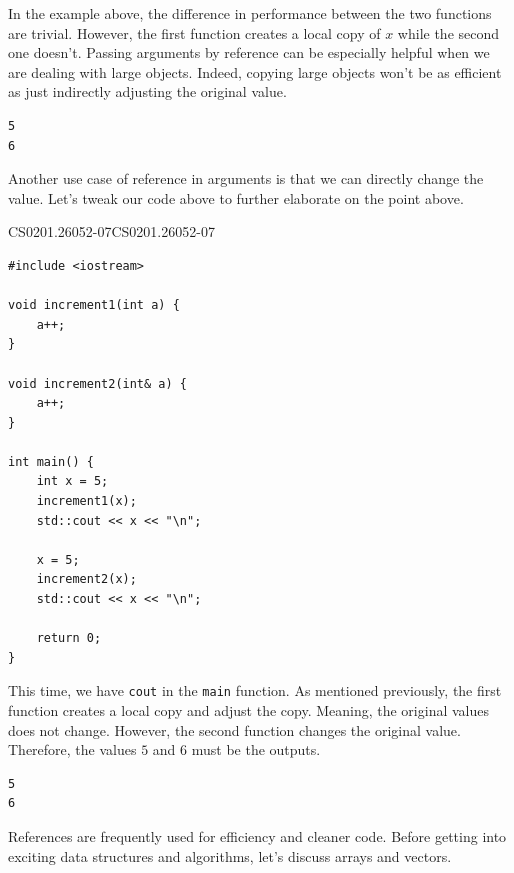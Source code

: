 \documentclass[../../../main.tex]{subfiles}
\begin{document}
In the example above, the difference in performance between the
two functions are trivial. However, the first function creates
a local copy of $x$ while the second one doesn't. Passing arguments
by reference can be especially helpful when we are dealing with
large objects. Indeed, copying large objects won't be as efficient
as just indirectly adjusting the original value.

\begin{outputbox}
\begin{lstlisting}[style=basic]
5
6
\end{lstlisting}
\end{outputbox}

Another use case of reference in arguments is that we can directly
change the value. Let's tweak our code above to further elaborate
on the point above.

\begin{cppbox}{CS0201.26052-07}{CS0201.26052-07}
\begin{lstlisting}[style=cppstyle]
#include <iostream>

void increment1(int a) {
    a++;
}

void increment2(int& a) {
    a++;
}

int main() {
    int x = 5;
    increment1(x);
    std::cout << x << "\n";

    x = 5;
    increment2(x);
    std::cout << x << "\n";

    return 0;
}
\end{lstlisting}
\end{cppbox}

This time, we have \verb|cout| in the \verb|main| function. As
mentioned previously, the first function creates a local copy and
adjust the copy. Meaning, the original values does not change.
However, the second function changes the original value. Therefore,
the values $5$ and $6$ must be the outputs.

\begin{outputbox}
\begin{lstlisting}[style=basic]
5
6
\end{lstlisting}
\end{outputbox}

References are frequently used for efficiency and cleaner code.
Before getting into exciting data structures and algorithms,
let's discuss arrays and vectors.
\end{document}
